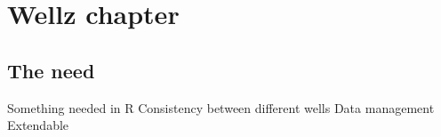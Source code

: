 \chapter{Wellz chapter}

\section{The need}
Something needed in R
Consistency between different wells
Data management
Extendable


